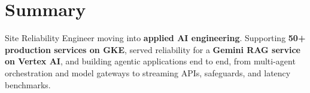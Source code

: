 \section{Summary}
\small{
  Site Reliability Engineer moving into \textbf{applied AI engineering}. Supporting \textbf{50+ production services on GKE}, served
  reliability for a \textbf{Gemini RAG service on Vertex AI}, and building agentic applications
  end to end, from multi-agent orchestration and model gateways to streaming APIs, safeguards,
  and latency benchmarks.
}
